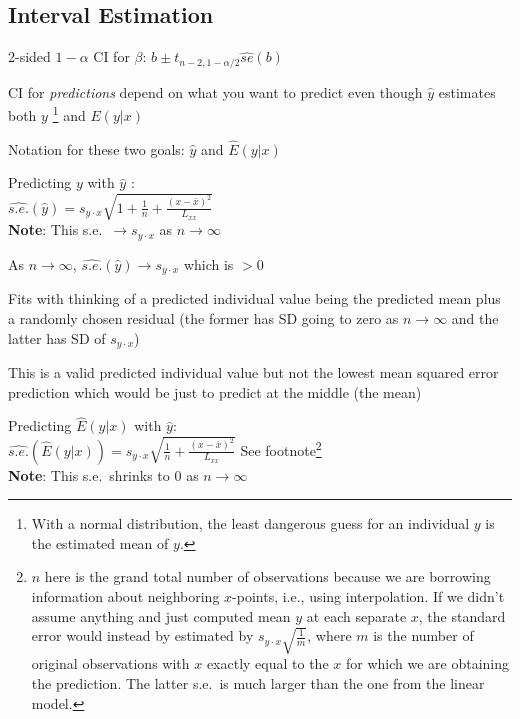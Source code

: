 \subsection{Interval Estimation}
\bi
\item 2-sided $1-\alpha$ CI for $\beta$: $b \pm t_{n-2,1-\alpha/2}
  \widehat{se}(b)$
\item CI for \emph{predictions} depend on what you want to predict
  even though $\hat{y}$ estimates both $y$ \footnote{With a normal
    distribution, the least dangerous guess for an individual $y$ is the
    estimated mean of $y$.}  and $E(y|x)$
\item Notation for these two goals: $\hat{y}$ and $\hat{E}(y|x)$
 \bi
 \item Predicting $y$ with $\hat{y}$ :\ipacue \\
   $\widehat{s.e.}(\hat{y}) = s_{y \cdot x} \sqrt{1 + \frac{1}{n} +
   \frac{(x-\bar{x})^{2}}{L_{xx}}}$ \\
   \textbf{Note}: This s.e.\ $\rightarrow s_{y\cdot x}$ as $n
   \rightarrow \infty$
   \bi
   \item As $n\rightarrow \infty$, $\widehat{s.e.}(\hat{y}) \rightarrow s_{y \cdot x}$ which is $> 0$
   \item Fits with thinking of a predicted individual value being the
     predicted mean plus a randomly chosen residual (the former has SD
     going to zero as $n \rightarrow \infty$ and the latter has SD of
     $s_{y \cdot x}$)
   \item This is a valid predicted individual value but not the lowest mean
     squared error prediction which would be just to predict at the middle
     (the mean)
   \ei
 \item Predicting $\hat{E}(y|x)$ with $\hat{y}$:\ipacue \\
   $\widehat{s.e.}(\hat{E}(y|x)) = s_{y \cdot x} \sqrt{\frac{1}{n} +
   \frac{(x-\bar{x})^{2}}{L_{xx}}}$ See footnote\footnote{$n$ here is
   the grand
     total number of observations because we are borrowing information
     about neighboring $x$-points, i.e., using interpolation.  If we
     didn't assume anything and just computed mean $y$ at each
     separate $x$, the standard error would instead by estimated by
     $s_{y\cdot x}\sqrt{\frac{1}{m}}$, where $m$ is the number of
     original observations with $x$ exactly equal to the $x$ for which
     we are obtaining the prediction.  The latter s.e.\ is much larger
     than the one from the linear model.} \\
   \textbf{Note}: This s.e.\ shrinks to 0 as $n \rightarrow \infty$
